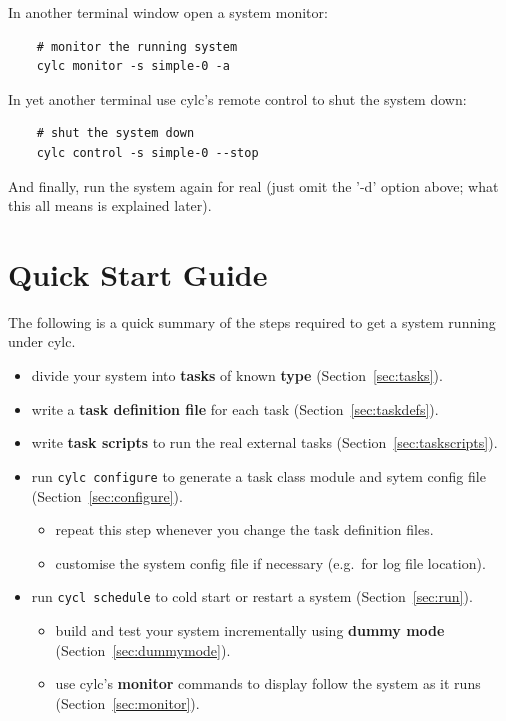 \documentclass[11pt,a4paper]{article}
\begin{document}
In another terminal window open a system monitor:

\begin{lstlisting}
    # monitor the running system
    cylc monitor -s simple-0 -a
\end{lstlisting}

In yet another terminal use cylc's remote control to shut the system
down:

\begin{lstlisting}
    # shut the system down
    cylc control -s simple-0 --stop
\end{lstlisting}

And finally, run the system again for real (just omit the '-d' option
above; what this all means is explained later).

\pagebreak
\section{Quick Start Guide}

The following is a quick summary of the steps required to get a system
running under cylc.

\begin{itemize}
    \item divide your system into {\bf tasks} of known {\bf type}
        (Section~\ref{sec:tasks}).

    \item write a {\bf task definition file} for each task
        (Section~\ref{sec:taskdefs}).

    \item write {\bf task scripts} to run the real external tasks 
        (Section~\ref{sec:taskscripts}).

    \item run \lstinline=cylc configure= to generate a task class module and
        sytem config file (Section~\ref{sec:configure}).

    \begin{itemize}
        \item repeat this step whenever you change the task definition files.
        \item customise the system config file if necessary (e.g.\ for
            log file location).
    \end{itemize}

    \item run \lstinline=cycl schedule= to cold start or restart a system
        (Section~\ref{sec:run}).

    \begin{itemize}

        \item build and test your system incrementally using {\bf dummy
            mode} (Section~\ref{sec:dummymode}).

        \item use cylc's {\bf monitor} commands to display follow the
            system as it runs (Section~\ref{sec:monitor}).
    \end{itemize}

\end{itemize}
\end{document}

